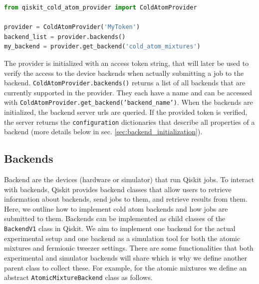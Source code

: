 \documentclass[a4paper, 10pt]{article}
\newcommand{\co}[1]{\texttt{#1}}
\begin{document}
\begin{lstlisting}[language=Python]
from qiskit_cold_atom_provider import ColdAtomProvider

provider = ColdAtomProvider('MyToken')
backend_list = provider.backends() 
my_backend = provider.get_backend('cold_atom_mixtures')
\end{lstlisting}
The provider is initialized with an access token string, that will later be used to verify the access to the device backends when actually submitting a job to the backend. \texttt{ColdAtomProvider.backends()} returns a list of all backends that are currently supported in the provider. They each have a name and can be accessed with \texttt{ColdAtomProvider.get\_backend('backend\_name')}. When the backends are initialized, the backend server urls are queried. If the provided token is verified, the server returns the \co{configuration} dictionaries that describe all properties of a backend (more details below in sec. \ref{sec:backend_initialization}).

\subsection{Backends}

Backend are the devices (hardware or simulator) that run Qiskit jobs.
To interact with backends, Qiskit provides backend classes that allow users to retrieve information about backends, send jobs to them, and retrieve results from them.
Here, we outline how to implement cold atom backends and how jobs are submitted to them.
Backends can be implemented as child classes of the \texttt{BackendV1} class in Qiskit. We aim to implement one backend for the actual experimental setup and one backend as a simulation tool for both the atomic mixtures and fermionic tweezer settings.
There are some functionalities that both experimental and simulator backends will share which is why we define another parent class to collect these. 
For example, for the atomic mixtures we define an abstract \co{AtomicMixtureBackend} class as follows.
\end{document}
